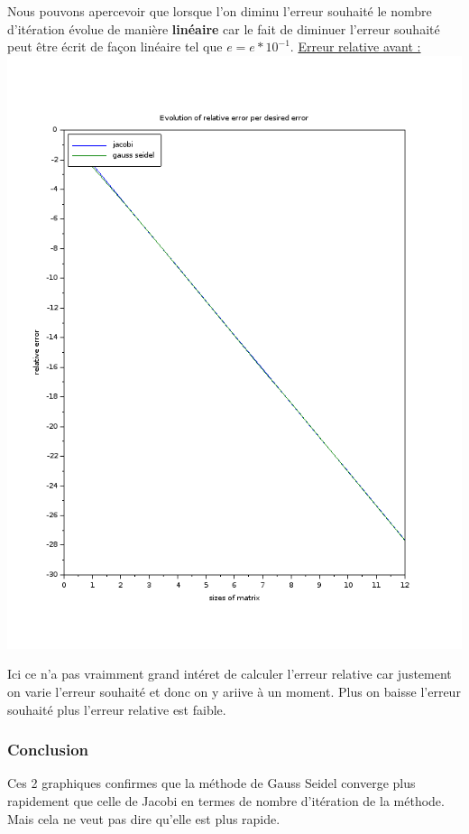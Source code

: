 \documentclass[11pt]{article}
\begin{document}
Nous pouvons apercevoir que lorsque l'on diminu l'erreur souhaité le
nombre d'itération évolue de manière \textbf{linéaire} car le fait de
diminuer l'erreur souhaité peut être écrit de façon linéaire tel que
$e = e * 10^{-1}$.\newline
\vspace{5mm}
\underline{Erreur relative avant :}\newline
\includegraphics[scale=0.5]{img/error_relres.png}

Ici ce n'a pas vraimment grand intéret de calculer l'erreur relative
car justement on varie l'erreur souhaité et donc on y ariive à un
moment. Plus on baisse l'erreur souhaité plus l'erreur relative est faible.

\subsubsection{Conclusion}

Ces 2 graphiques confirmes que la méthode de Gauss Seidel converge
plus rapidement que celle de Jacobi en termes de nombre d'itération de
la méthode. Mais cela ne veut pas dire qu'elle est plus rapide.
\end{document}
